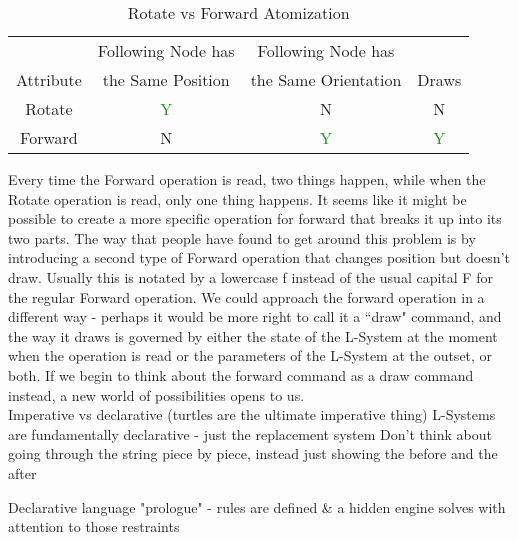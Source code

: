 \documentclass[12pt,twoside]{reedthesis}
\begin{document}
\begin{longtable}{|c||c|c|c|}
	 	\caption[Rotate vs Forward Atomization]{Rotate vs Forward Atomization}\\ \hline
		    	      & Following Node has & Following Node has &  \\  
		   Attribute & the Same Position &  the Same Orientation & Draws \\\hline%
		  \endfirsthead
		    \endhead

	    Rotate & \textcolor{ForestGreen}{Y} & \textcolor{WildStrawberry}{N} & \textcolor{WildStrawberry}{N}  \\\hline
	    Forward & \textcolor{WildStrawberry}{N} & \textcolor{ForestGreen}{Y} & \textcolor{ForestGreen}{Y}  \\\hline

\end{longtable}

Every time the Forward operation is read, two things happen, while when the Rotate operation is read, only one thing happens. It seems like it might be possible to create a more specific operation for forward that breaks it up into its two parts. The way that people have found to get around this problem is by introducing a second type of Forward operation that changes position but doesn't draw. Usually this is notated by a lowercase f instead of the usual capital F for the regular Forward operation. We could approach the forward operation in a different way - perhaps it would be more right to call it a ``draw" command, and the way it draws is governed by either the state of the L-System at the moment when the operation is read or the parameters of the L-System at the outset, or both. If we begin to think about the forward command as a draw command instead, a new world of possibilities opens to us.\\

Imperative vs declarative (turtles are the ultimate imperative thing) 
L-Systems are fundamentally declarative - just the replacement system
Don't think about going through the string piece by piece, instead just showing the before and the after

Declarative language "prologue" - rules are defined \& a hidden engine solves with attention to those restraints
\end{document}
